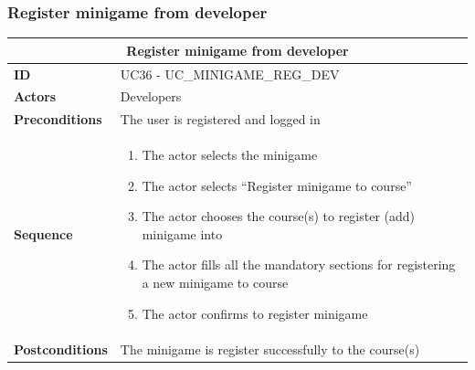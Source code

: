 \subsubsection{Register minigame from developer}
\begin{tabular}{|m{2.5cm}|m{8cm}|}
	\hline
	\multicolumn{2}{|c|}{Register minigame from developer} \\
	\hline
	\textbf{ID} & UC36 - UC\_MINIGAME\_REG\_DEV \\
	\hline
	\textbf{Actors} & Developers \\
	\hline
	\textbf{Preconditions} & The user is registered and logged in \\
	\hline
	\textbf{Sequence} & 
	\begin{enumerate}
		\item The actor selects the minigame
		\item The actor selects “Register minigame to course”
		\item The actor chooses the course(s) to register (add) minigame into
		\item The actor fills all the mandatory sections for registering a new minigame to course
		\item The actor confirms to register minigame
	\end{enumerate} \\
	\hline
	\textbf{Postconditions} & The minigame is register successfully to the course(s) \\
	\hline
\end{tabular}

